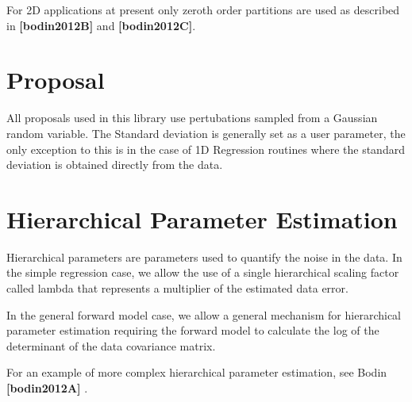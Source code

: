 For 2D applications at present only zeroth order partitions are used as described in {\bfseries [bodin2012B]} and {\bfseries [bodin2012C]}.\hypertarget{background_backgroundproposal}{}\section{Proposal}\label{background_backgroundproposal}
All proposals used in this library use pertubations sampled from a Gaussian random variable. The Standard deviation is generally set as a user parameter, the only exception to this is in the case of 1D Regression routines where the standard deviation is obtained directly from the data.\hypertarget{background_backgroundhierarchical}{}\section{Hierarchical Parameter Estimation}\label{background_backgroundhierarchical}
Hierarchical parameters are parameters used to quantify the noise in the data. In the simple regression case, we allow the use of a single hierarchical scaling factor called lambda that represents a multiplier of the estimated data error.

In the general forward model case, we allow a general mechanism for hierarchical parameter estimation requiring the forward model to calculate the log of the determinant of the data covariance matrix.

For an example of more complex hierarchical parameter estimation, see Bodin {\bfseries [bodin2012A]} . 